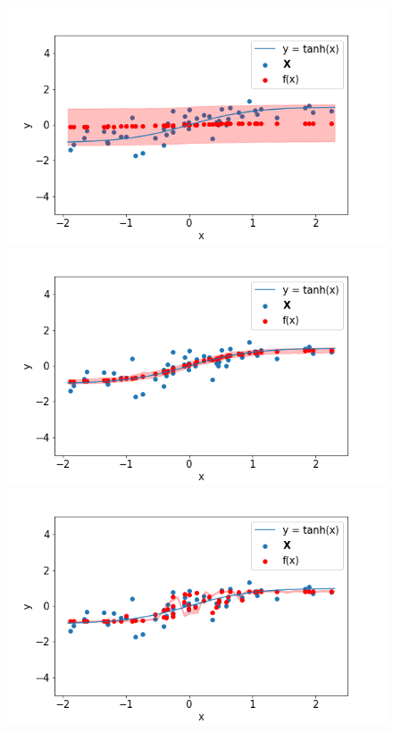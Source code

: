\begin{figure}
 \begin{minipage}[]{.3\textwidth}
    \includegraphics[width=\textwidth]{plot_1kld.png}
\subcaption{}
\end{minipage}
 \begin{minipage}{.3\textwidth}
    \includegraphics[width=\textwidth]{plot_1elbo.png}
\subcaption{}
\end{minipage}
 \begin{minipage}{.3\textwidth}
    \includegraphics[width=\textwidth]{plot_1overfit.png}
\subcaption{}
\end{minipage}



\end{figure}
